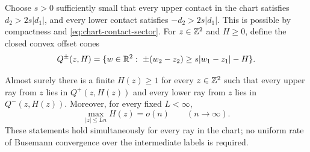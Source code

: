 Choose $s>0$ sufficiently small that every upper contact in the chart
satisfies $d_2>2s|d_1|$, and every lower contact satisfies
$-d_2>2s|d_1|$.  This is possible by compactness and
\eqref{eq:chart-contact-sector}.  For $z\in\mathbb Z^2$ and $H\geq0$, define the
closed convex offset cones
\begin{equation}\label{eq:offset-cones}
 Q^\pm(z,H)=
 \{w\in\mathbb R^2:\ \pm(w_2-z_2)\geq s|w_1-z_1|-H\}.
\end{equation}

\begin{proposition}\label{prop:cone}
Almost surely there is a finite $H(z)\geq1$ for every $z\in\mathbb Z^2$ such that
every upper ray from $z$ lies in $Q^+(z,H(z))$ and every lower ray from $z$
lies in $Q^-(z,H(z))$.  Moreover, for every fixed $L<\infty$,
\begin{equation}\label{eq:uniform-cone-offset}
 \max_{|z|\leq Ln}H(z)=o(n)\qquad(n\to\infty).
\end{equation}
These statements hold simultaneously for every ray in the chart; no
uniform rate of Busemann convergence over the intermediate labels is
required.
\end{proposition}

